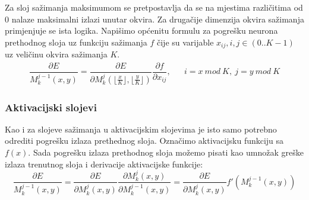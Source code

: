 \documentclass[times, utf8, zavrsni]{fer}
\begin{document}
Za sloj sažimanja maksimumom se pretpostavlja da se na mjestima različitima od 0 nalaze maksimalni izlazi unutar okvira. Za drugačije dimenzija okvira sažimanja primjenjuje se ista logika. Napišimo općenitu formulu za pogrešku neurona prethodnog sloja uz funkciju sažimanja $f$ čije su varijable $x_{ij}, i, j \in (0 .. K-1)$ uz veličinu okvira sažimanja $K$.
\begin{align}\label{eq:pool-sloj-err}
\dfrac{\partial E}{M^{j-1}_k (x, y)} = \dfrac{\partial E}{\partial M^j_k (\lfloor \frac{x}{K} \rfloor, \lfloor \frac{y}{K} \rfloor)} \dfrac{\partial f}{\partial x_{ij}}, && i = x\ mod\ K,\ j = y\ mod\ K
\end{align}  

\subsubsection{Aktivacijski slojevi}
Kao i za slojeve sažimanja u aktivacijskim slojevima je isto samo potrebno odrediti pogrešku izlaza prethednog sloja. Označimo aktivacijsku funkciju sa $f(x)$. Sada pogrešku izlaza prethodnog sloja možemo pisati kao umnožak greške izlaza trenutnog sloja i derivacije aktivacijske funkcije:
\begin{equation}\label{eq:act-sloj-err}
\dfrac{\partial E}{M^{j-1}_k (x, y)} = \dfrac{\partial E}{\partial M^j_k (x, y)} \dfrac{\partial M^j_k (x, y)}{\partial M^{j-1}_k (x, y)} = \dfrac{\partial E}{\partial M^j_k (x, y)} f'(M^{j-1}_k (x, y))
\end{equation}
\end{document}
